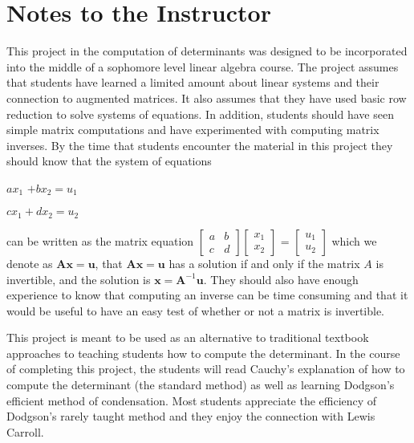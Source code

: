 \documentclass[11pt]{article}%
\theoremstyle{definition}
\begin{document}
\bigskip

\newpage

\section*{Notes to the Instructor}

This project in the computation of determinants was designed to be
incorporated into the middle of a sophomore level linear algebra course. The
project assumes that students have learned a limited amount about linear
systems and their connection to augmented matrices. It also assumes that they
have used basic row reduction to solve systems of equations. In addition,
students should have seen simple matrix computations and have experimented
with computing matrix inverses. By the time that students encounter the
material in this project they should know that the system of equations

\begin{center}
$ax_{1}$ $+bx_{2}=u_{1}$

$cx_{1}+dx_{2}=u_{2}$
\end{center}

\noindent can be written as the matrix equation $%
\begin{bmatrix}
a & b\\
c & d
\end{bmatrix}%
\begin{bmatrix}
x_{1}\\
x_{2}%
\end{bmatrix}
$ = $%
\begin{bmatrix}
u_{1}\\
u_{2}%
\end{bmatrix}
$ which we denote as $\mathbf{Ax=u}$, that $\mathbf{Ax=u}$ has a solution if
and only if the matrix $A$ is invertible, and the solution is\textbf{
}$\mathbf{x=A}^{-1}\mathbf{u}$. They should also have enough experience to
know that computing an inverse can be time consuming and that it would be
useful to have an easy test of whether or not a matrix is invertible.

This project is meant to be used as an alternative to traditional textbook
approaches to teaching students how to compute the determinant. In the course
of completing this project, the students will read Cauchy's explanation of how
to compute the determinant (the standard method) as well as learning Dodgson's
efficient method of condensation. Most students appreciate the efficiency of
Dodgson's rarely taught method and they enjoy the connection with Lewis Carroll.
\end{document}
